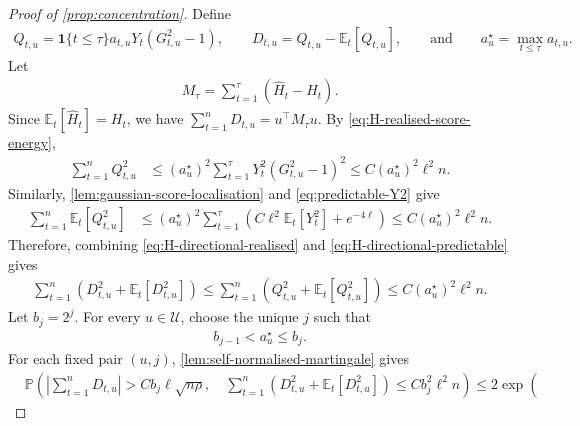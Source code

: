 \documentclass[11pt]{article}
\newcommand{\E}{\mathbb E}
\newcommand{\Pp}{\mathbb P}
\newcommand{\1}{\mathbf 1}
\begin{document}
\begin{proof}[Proof of \cref{prop:concentration}]
    Define
    \begin{align}
        Q_{t,u}
        =
        \1\{t\leq\tau\}
        a_{t,u}Y_t(G_{t,u}^2-1), \qquad
        D_{t,u}
        =
        Q_{t,u}-\E_t[Q_{t,u}],
        \qquad\text{and}\qquad
        a_u^\star=\max_{t\leq\tau}a_{t,u}.
    \end{align}
    Let
    \begin{align}
        M_\tau
        =
        \sum_{t=1}^{\tau}(\widehat H_t-H_t).
    \end{align}
    Since $\E_t[\widehat H_t]=H_t$, we have
    $\sum_{t=1}^nD_{t,u} = u^\top M_\tau u$.
    By \eqref{eq:H-realised-score-energy},
    \begin{align}
        \sum_{t=1}^nQ_{t,u}^2
         & \leq
        (a_u^\star)^2
        \sum_{t=1}^{\tau}
        Y_t^2(G_{t,u}^2-1)^2
        \leq
        C(a_u^\star)^2\ell^2n.
        \label{eq:H-directional-realised}
    \end{align}
    Similarly, \cref{lem:gaussian-score-localisation} and
    \eqref{eq:predictable-Y2} give
    \begin{align}
        \sum_{t=1}^n\E_t[Q_{t,u}^2]
         & \leq
        (a_u^\star)^2
        \sum_{t=1}^{\tau}
        \left(
        C\ell^2\E_t[Y_t^2]+e^{-4\ell}
        \right)
        \leq
        C(a_u^\star)^2\ell^2n.
        \label{eq:H-directional-predictable}
    \end{align}
    Therefore, combining \eqref{eq:H-directional-realised} and
    \eqref{eq:H-directional-predictable} gives
    \begin{align}
        \sum_{t=1}^n
        \left(
        D_{t,u}^2+\E_t[D_{t,u}^2]
        \right)
        \leq
        \sum_{t=1}^n
        \left(
        Q_{t,u}^2+\E_t[Q_{t,u}^2]
        \right)
        \leq
        C(a_u^\star)^2\ell^2n.
        \label{eq:H-directional-self-normaliser}
    \end{align}
    Let $b_j=2^j$.
    For every $u\in\mathcal U$, choose the unique $j$ such that
    \begin{align}
        b_{j-1}<a_u^\star\leq b_j.
    \end{align}
    For each fixed pair
    $(u,j)$, \cref{lem:self-normalised-martingale} gives
    \begin{align}
         & \Pp\left(
        \left|\sum_{t=1}^nD_{t,u}\right|
        >Cb_j\ell\sqrt{n\rho},
        \quad
        \sum_{t=1}^n
        \left(
        D_{t,u}^2+\E_t[D_{t,u}^2]
        \right)
        \leq Cb_j^2\ell^2n
        \right)
        \leq
        2\exp\left(

\end{align}
\end{proof}
\end{document}
